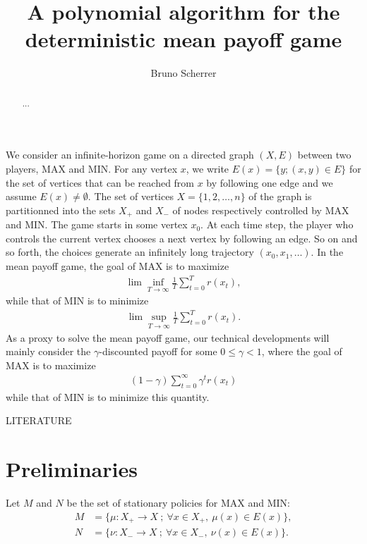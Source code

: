 \documentclass{article}
\title{A polynomial algorithm for the deterministic mean payoff game}
\author{Bruno Scherrer}
\begin{document}
\maketitle

\begin{abstract}
...
\end{abstract}
  
We consider an infinite-horizon game on a directed graph $(X,E)$ between two players, MAX and MIN. For any vertex $x$, we write $E(x)=\{y;(x,y) \in E\}$ for the set of vertices that can be reached from $x$ by following one edge and we assume $E(x)\neq\emptyset$.  The set of vertices $X=\{1,2,\dots,n\}$ of the graph is partitionned into the sets $X_+$ and $X_-$ of nodes respectively controlled by MAX and MIN. The game starts in some vertex $x_0$. At each time step, the player who controls the current vertex chooses a next vertex by following an edge. So on and so forth, the choices generate an infinitely long trajectory $(x_0,x_1,\dots)$. In the mean payoff game, the goal of MAX is to maximize
\begin{align}
\lim\inf_{T \to \infty} \frac 1 T \sum_{t=0}^{T} r(x_t),
\end{align}
while that of MIN is to minimize
\begin{align}
\lim\sup_{T \to \infty} \frac 1 T \sum_{t=0}^{T} r(x_t).
\end{align}
As a proxy to solve the mean payoff game, our technical developments will mainly consider the $\gamma$-discounted payoff for some $0\le\gamma<1$, where the goal of MAX is to maximize
\begin{align}
(1-\gamma)\sum_{t=0}^{\infty} \gamma^t r(x_t)
\end{align}
while that of MIN is to minimize this quantity.

LITERATURE

\section{Preliminaries}

Let $M$ and $N$ be the set of stationary policies for MAX and MIN:
\begin{align}
  M &= \{ \mu:X_+ \to X ~;~ \forall x\in X_+,~ \mu(x) \in E(x) \}, \\
  N & =\{ \nu:X_- \to X ~;~ \forall x\in X_-,~ \nu(x) \in E(x) \}.
\end{align}
\end{document}
